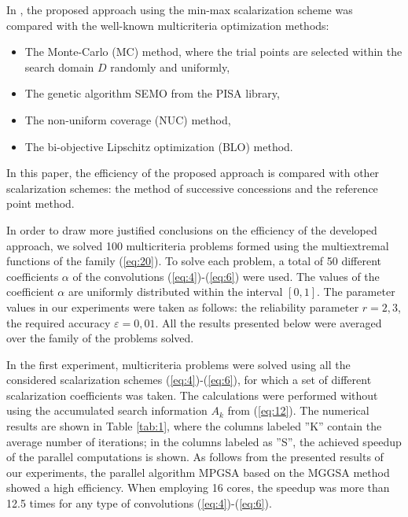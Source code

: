 \documentclass[runningheads]{llncs}
\begin{document}
In \cite{c9}, the proposed approach using the min-max scalarization scheme was compared with the well-known multicriteria optimization methods:
\begin{itemize}
	\item The Monte-Carlo (MC) method, where the trial points are selected within the search domain $D$ randomly and uniformly,
	\item The genetic algorithm SEMO from the PISA library,
	\item The non-uniform coverage (NUC) method,
	\item The bi-objective Lipschitz optimization (BLO) method.
\end{itemize}

In this paper, the efficiency of the proposed approach is compared with other scalarization schemes: the method of successive concessions and the reference point method.

In order to draw more justified conclusions on the efficiency of the developed approach, we solved 100 multicriteria problems formed using the multiextremal functions of the family (\ref{eq:20}). To solve each problem, a total of 50 different coefficients $\alpha$ of the convolutions (\ref{eq:4})-(\ref{eq:6}) were used. The values of the coefficient $\alpha$ are uniformly distributed within the interval $[0,1]$. The parameter values in our experiments were taken as follows: the reliability parameter $r=2,3$, the required accuracy $\varepsilon = 0,01$. All the results presented below were averaged over the family of the  problems solved.

In the first experiment, multicriteria problems were solved using all the considered scalarization schemes (\ref{eq:4})-(\ref{eq:6}), for which a set of different scalarization coefficients was taken. The calculations were performed without using the accumulated search information $A_k$ from (\ref{eq:12}). The numerical results are shown in Table \ref{tab:1}, where the columns labeled ''K'' contain the average number of iterations; in the columns labeled as ''S'', the achieved speedup of the parallel computations is shown. As follows from the presented results of our experiments, the parallel algorithm MPGSA based on the MGGSA method \cite{c10,c16} showed a high efficiency. When employing 16 cores, the speedup was more than 12.5 times for any type of convolutions (\ref{eq:4})-(\ref{eq:6}).
\end{document}
